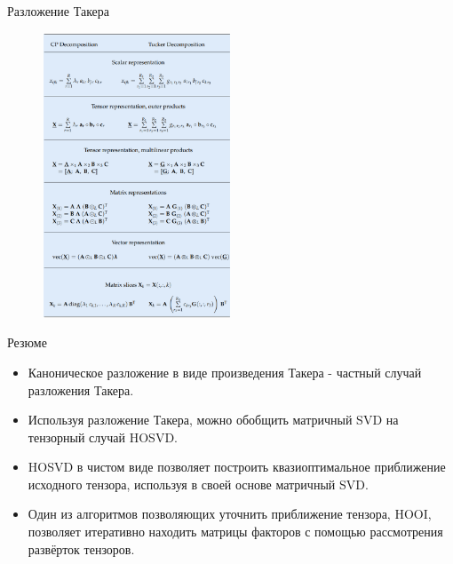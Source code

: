 \begin{frame}{Разложение Такера}
\begin{figure}
    \centering
    \includegraphics[width=0.5\textwidth]{lecture_12/figs/CP_Tuker.png}
\end{figure}
\end{frame}

\begin{frame}{Резюме}
\begin{itemize}
    \item Каноническое разложение в виде произведения Такера - частный случай разложения Такера.
    \item Используя разложение Такера, можно обобщить матричный SVD на тензорный случай HOSVD.
    \item HOSVD в чистом виде позволяет построить квазиоптимальное приближение исходного тензора, используя в своей основе матричный SVD.
    \item Один из алгоритмов позволяющих уточнить приближение тензора, HOOI,  позволяет итеративно находить матрицы факторов с помощью рассмотрения развёрток тензоров.
\end{itemize}
\end{frame}
 